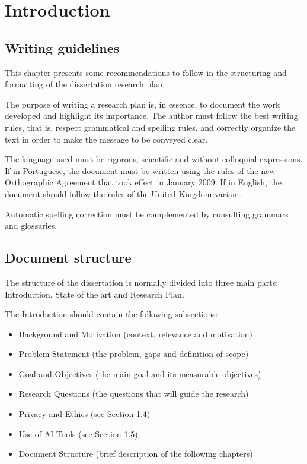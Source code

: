 % 
\chapter{Introduction} %
\label{chap:Chapter1} %


%
\section{Writing guidelines}
\label{sec:chap1_guidelines} %

This chapter presents some recommendations to follow in the structuring and formatting of the dissertation research plan.

The purpose of writing a research plan is, in essence, to document the work developed and highlight its importance. The author must follow the best writing rules, that is, respect grammatical and spelling rules, and correctly organize the text in order to make the message to be conveyed clear.

The language used must be rigorous, scientific and without colloquial expressions. If in Portuguese, the document must be written using the rules of the new Orthographic Agreement that took effect in January 2009. If in English, the document should follow the rules of the United Kingdom variant.

Automatic spelling correction must be complemented by consulting grammars and glossaries.


\section{Document structure}

The structure of the dissertation is normally divided into three main parts: Introduction, State of the art and Research Plan.

The Introduction should contain the following subsections:
\begin{itemize}
  \item Background and Motivation (context, relevance and motivation)
  \item Problem Statement (the problem, gaps and definition of scope)
  \item Goal and Objectives (the main goal and its measurable objectives)
  \item Research Questions (the questions that will guide the research)
  \item Privacy and Ethics (see Section 1.4)
  \item Use of AI Tools (see Section 1.5)
  \item Document Structure (brief description of the following chapters)
\end{itemize}

